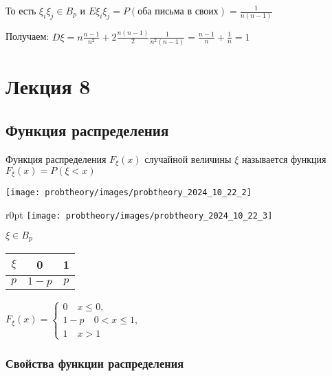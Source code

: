 \documentclass[12pt]{article}
\begin{document}
    То есть $\xi_i\xi_j \in B_p$ и $E\xi_i \xi_j = P(\text{оба письма в своих}) = \frac{1}{n(n - 1)}$

    Получаем: $D\xi = n \frac{n - 1}{n^2} + 2\frac{n(n - 1)}{2}\frac{1}{n^2(n - 1)} = \frac{n - 1}{n} + \frac{1}{n} = 1$


    \section{Лекция 8}

    \subsection{Функция распределения}

    \hypertarget{distributionfunction}{}

    \Def Функция распределения $F_\xi(x)$ случайной величины $\xi$ называется функция $F_\xi(x) = P(\xi < x)$

    \texttt{[image: probtheory/images/probtheory\_2024\_10\_22\_2]}

    \begin{minipage}{\textwidth}
        \begin{wrapfigure}{r}{0pt}
            \texttt{[image: probtheory/images/probtheory\_2024\_10\_22\_3]}
        \end{wrapfigure}

        \Ex $\xi \in B_p$ \qquad \begin{tabular}{c|c|c}
            $\xi$ & 0 & 1 \\ \hline
            $p$ & $1 - p$ & $p$ \\
        \end{tabular}
        
        $F_\xi(x) = \begin{cases}0 \quad x \leq 0, \\ 1 - p \quad 0 < x \leq 1, \\ 1 \quad x > 1\end{cases}$

    \end{minipage}

    \hypertarget{distributionfunctionproperties}{}

    \subsubsection{Свойства функции распределения}
\end{document}
